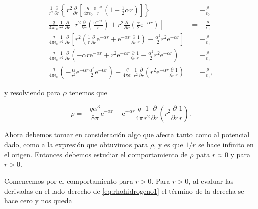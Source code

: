 \documentclass[a4paper,11pt]{article}
\numberwithin{equation}{section}
\newcommand{\euler}{\mathrm{e}}
\begin{document}
\begin{align*}
  \frac{1}{r^2}\frac{\partial}{\partial r}
 \left\{r^2\frac{\partial}{\partial r}\left[\frac{q}{4\pi\epsilon_0}
 \frac{\euler^{-\alpha r}}{r}\left(1 + \frac{1}{2}\alpha r\right)\right] \right\} &= 
 - \frac{\rho}{\epsilon_0} \\
 \frac{q}{4\pi\epsilon_0}\frac{1}{r^2}\frac{\partial}{\partial r}
 \left[r^2\frac{\partial}{\partial r}\left(\frac{\euler^{-\alpha r}}{r}\right) 
 + r^2\frac{\partial}{\partial r}\left(\frac{\alpha}{2}\euler^{-\alpha r}\right)
 \right] &= - \frac{\rho}{\epsilon_0} \\
  \frac{q}{4\pi\epsilon_0}\frac{1}{r^2}\frac{\partial}{\partial r}
  \left[r^2\left(\frac{1}{r}\frac{\partial}{\partial r}\euler^{-\alpha r}
  + \euler^{-\alpha r}\frac{\partial}{\partial r}\frac{1}{r}\right)
  - \frac{\alpha^2}{2}r^2\euler^{-\alpha r}\right] &= - \frac{\rho}{\epsilon_0} \\
  \frac{q}{4\pi\epsilon_0}\frac{1}{r^2}\frac{\partial}{\partial r}
  \left(-\alpha r \euler^{-\alpha r} + r^2\euler^{-\alpha r} 
  \frac{\partial}{\partial r}\frac{1}{r} - \frac{\alpha^2}{2}r^2\euler^{-\alpha r}
  \right) &= - \frac{\rho}{\epsilon_0} \\
  \frac{q}{4\pi\epsilon_0}\left(-\frac{\alpha}{r^2}\euler^{-\alpha r} 
  \frac{\alpha^3}{2}\euler^{-\alpha r}\right) + \frac{q}{4\pi\epsilon_0}
  \frac{1}{r^2}\frac{\partial}{\partial r}\left(r^2\euler^{-\alpha r} 
  \frac{\partial}{\partial r}\frac{1}{r}\right) &= - \frac{\rho}{\epsilon_0}, 
\end{align*}

y resolviendo para $\rho$ tenemos que 

\begin{equation}
 \rho = - \frac{q\alpha^3}{8\pi}\euler^{-\alpha r} - 
 \euler^{-\alpha r}\frac{q}{4\pi}\frac{1}{r^2}\frac{\partial}{\partial r}
 \left(r^2\frac{\partial}{\partial r}\frac{1}{r} \right).
 \label{eq:rhohidrogeno1}
\end{equation}

Ahora debemos tomar en consideración algo que afecta tanto como al potencial dado,
como a la expresión que obtuvimos para $\rho$, y es que $1/r$ se hace infinito en 
el origen. Entonces debemos estudiar el comportamiento de $\rho$ pata $r \approx 
0$ y para $r > 0$. 

\vspace{.3cm}

Comencemos por el comportamiento para $r > 0$. Para $r > 0$, al evaluar las derivadas 
en el lado derecho de \eqref{eq:rhohidrogeno1} el término de la derecha se hace 
cero y nos queda 
\end{document}
